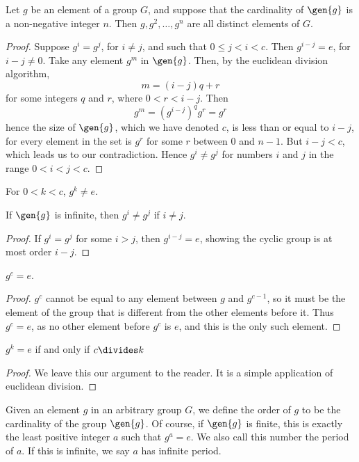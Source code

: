 \begin{lemma} Let $g$ be an element of a group $G$, and suppose that the cardinality of $\gen{g}$ is a non-negative integer $n$. Then $g, g^2, \dots, g^n$ are all distinct elements of $G$.
\end{lemma}
\begin{proof}
    Suppose $g^i = g^j$, for $i \neq j$, and such that $0 \leq j < i < c$. Then $g^{i - j} = e$, for $i - j \neq 0$. Take any element $g^m$ in $\gen{g}$. Then, by the euclidean division algorithm,
    \[ m = (i - j)q + r \]
    for some integers $q$ and $r$, where $0 < r < i - j$. Then
    \[ g^m = (g^{i - j})^q g^r = g^r \]
    hence the size of $\gen{g}$, which we have denoted $c$, is less than or equal to $i - j$, for every element in the set is $g^r$ for some $r$ between 0 and $n-1$. But $i - j < c$, which leads us to our contradiction. Hence $g^i \neq g^j$ for numbers $i$ and $j$ in the range $0 < i < j < c$.
\end{proof}

\begin{corollary} For $0 < k < c$, $g^k \neq e$. \end{corollary}

\begin{corollary} If $\gen{g}$ is infinite, then $g^i \neq g^j$ if $i \neq j$. \end{corollary}
\begin{proof}
    If $g^i = g^j$ for some $i > j$, then $g^{i-j} = e$, showing the cyclic group is at most order $i - j$.
\end{proof}

\begin{corollary} $g^c = e$. \end{corollary}
\begin{proof} $g^c$ cannot be equal to any element between $g$ and $g^{c-1}$, so it must be the element of the group that is different from the other elements before it. Thus $g^c = e$, as no other element before $g^c$ is $e$, and this is the only such element. \end{proof}

\begin{lemma} $g^k = e$ if and only if $c \divides k$ \end{lemma}
\begin{proof} We leave this our argument to the reader. It is a simple application of euclidean division.
\end{proof}

Given an element $g$ in an arbitrary group $G$, we define the order of $g$ to be the cardinality of the group $\gen{g}$. Of course, if $\gen{g}$ is finite, this is exactly the least positive integer $a$ such that $g^a = e$. We also call this number the period of $a$. If this is infinite, we say $a$ has infinite period.

